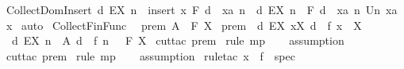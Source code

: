 \begin{isabellebody}
\isamarkupfalse%
%
\endisatagproof
{\isafoldproof}%
%
\isadelimproof
\isanewline
%
\endisadelimproof
\isanewline
{}\isamarkupfalse%
\ Collect{\isacharunderscore}Dom{\isacharunderscore}Insert{\isacharcolon}\ {\isachardoublequoteopen}{\isacharbraceleft}d{\isachardot}\ EX\ n\ {\isacharcolon}\ insert\ x\ F{\isachardot}\ d\ {\isacharequal}\ xa\ n{\isacharbraceright}\ {\isacharequal}\ {\isacharbraceleft}d{\isachardot}\ EX\ n\ {\isacharcolon}\ F{\isachardot}\ d\ {\isacharequal}\ xa\ n{\isacharbraceright}\ Un\ {\isacharbraceleft}xa\ x{\isacharbraceright}{\isachardoublequoteclose}\isanewline
%
\isadelimproof
%
\endisadelimproof
%
\isatagproof
{}\isamarkupfalse%
\ auto\isanewline
{}\isamarkupfalse%
%
\endisatagproof
{\isafoldproof}%
%
\isadelimproof
\isanewline
%
\endisadelimproof
\isanewline
{}\isamarkupfalse%
\ Collect{\isacharunderscore}Fin{\isacharunderscore}Func{\isacharcolon}\ \isanewline
{}\ prem{}{\isacharcolon}\ {\isachardoublequoteopen}A\ {\isacharcolon}\ {\isacharpercent}F\ X{\isachardoublequoteclose}\isanewline
{}\ prem{}{\isacharcolon}\ {\isachardoublequoteopen}\ {\isacharbraceleft}d{\isachardot}\ EX\ x{\isacharcolon}X{\isachardot}\ d\ {\isacharequal}\ f\ x{\isacharbraceright}\ {\isacharless}{\isacharequal}\ X{\isachardoublequoteclose}\isanewline
{}\ \ {\isachardoublequoteopen}{\isacharbraceleft}d{\isachardot}\ EX\ n\ {\isacharcolon}\ A{\isachardot}\ d\ {\isacharequal}\ {\isacharparenleft}f\ n{\isacharparenright}\ {\isacharbraceright}\ {\isacharcolon}\ {\isacharpercent}F\ X{\isachardoublequoteclose}\isanewline
%
\isadelimproof
%
\endisadelimproof
%
\isatagproof
{}\isamarkupfalse%
\ {\isacharparenleft}cut{\isacharunderscore}tac\ prem{}{\isacharparenright}\isanewline
{}\isamarkupfalse%
\ {\isacharparenleft}rule\ mp{\isacharparenright}\isanewline
{}\isamarkupfalse%
\ {}\ \isanewline
{}\isamarkupfalse%
\ {\isacharparenleft}assumption{\isacharparenright}\isanewline
{}\isamarkupfalse%
\ {\isacharparenleft}cut{\isacharunderscore}tac\ prem{}{\isacharparenright}\isanewline
{}\isamarkupfalse%
\ {\isacharparenleft}rule\ mp{\isacharparenright}\isanewline
{}\isamarkupfalse%
\ {}\ \isanewline
{}\isamarkupfalse%
\ {\isacharparenleft}assumption{\isacharparenright}\isanewline
{}\isamarkupfalse%
\ {\isacharparenleft}rule{\isacharunderscore}tac\ x\ {\isacharequal}\ {\isachardoublequoteopen}f{\isachardoublequoteclose}\ \ spec{\isacharparenright}\isanewline

\end{isabellebody}
